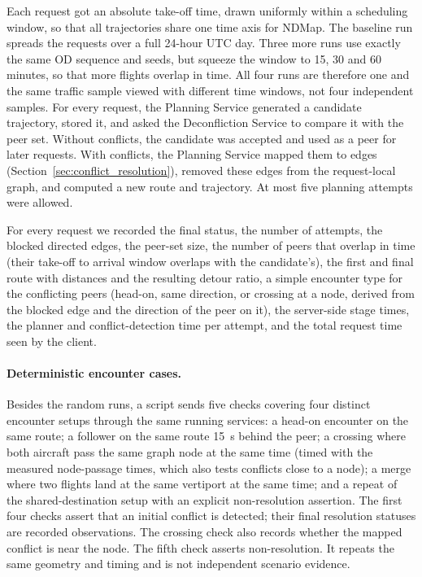 Each request got an absolute take-off time, drawn uniformly within a scheduling window, so that all trajectories share one time axis for NDMap. The baseline run spreads the requests over a full 24-hour UTC day. Three more runs use exactly the same OD sequence and seeds, but squeeze the window to 15, 30 and 60 minutes, so that more flights overlap in time. All four runs are therefore one and the same traffic sample viewed with different time windows, not four independent samples. For every request, the Planning Service generated a candidate trajectory, stored it, and asked the Deconfliction Service to compare it with the peer set. Without conflicts, the candidate was accepted and used as a peer for later requests. With conflicts, the Planning Service mapped them to edges (Section~\ref{sec:conflict_resolution}), removed these edges from the request-local graph, and computed a new route and trajectory. At most five planning attempts were allowed.

For every request we recorded the final status, the number of attempts, the blocked directed edges, the peer-set size, the number of peers that overlap in time (their take-off to arrival window overlaps with the candidate's), the first and final route with distances and the resulting detour ratio, a simple encounter type for the conflicting peers (head-on, same direction, or crossing at a node, derived from the blocked edge and the direction of the peer on it), the server-side stage times, the planner and conflict-detection time per attempt, and the total request time seen by the client.

\paragraph{Deterministic encounter cases.}
Besides the random runs, a script sends five checks covering four distinct encounter setups through the same running services: a head-on encounter on the same route; a follower on the same route \SI{15}{s} behind the peer; a crossing where both aircraft pass the same graph node at the same time (timed with the measured node-passage times, which also tests conflicts close to a node); a merge where two flights land at the same vertiport at the same time; and a repeat of the shared-destination setup with an explicit non-resolution assertion. The first four checks assert that an initial conflict is detected; their final resolution statuses are recorded observations. The crossing check also records whether the mapped conflict is near the node. The fifth check asserts non-resolution. It repeats the same geometry and timing and is not independent scenario evidence.

